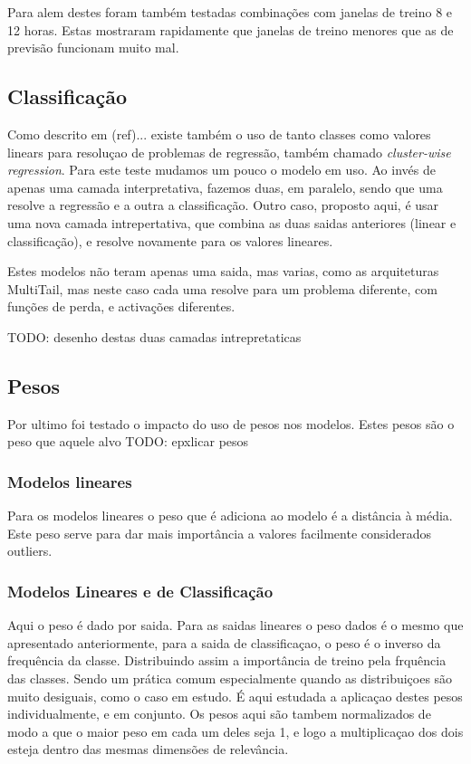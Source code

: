 Para alem destes foram também testadas combinações com janelas de treino 8 e 12 horas. Estas mostraram rapidamente que janelas de treino menores que as de previsão funcionam muito mal.

\subsection{Classificação}

Como descrito em (ref)... existe também o uso de tanto classes como valores linears para resoluçao de problemas de regressão, também chamado \textit{cluster-wise regression}.
Para este teste mudamos um pouco o modelo em uso. Ao invés de apenas uma camada interpretativa, fazemos duas, em paralelo, sendo que uma resolve a regressão e a outra a classificação.
Outro caso, proposto aqui, é usar uma nova camada intrepertativa, que combina as duas saidas anteriores (linear e classificação), e resolve novamente para os valores lineares.

Estes modelos não teram apenas uma saida, mas varias, como as arquiteturas MultiTail, mas neste caso cada uma resolve para um problema diferente, com funções de perda, e activações diferentes.

TODO: desenho destas duas camadas intrepretaticas

\subsection{Pesos}

Por ultimo foi testado o impacto do uso de pesos nos modelos. Estes pesos são o peso que aquele alvo TODO: epxlicar pesos

\subsubsection{Modelos lineares}

Para os modelos lineares o peso que é adiciona ao modelo é a distância à média.
Este peso serve para dar mais importância a valores facilmente considerados outliers.



\subsubsection{Modelos Lineares e de Classificação}
Aqui o peso é dado por saida. Para as saidas lineares o peso dados é o mesmo que apresentado anteriormente, para a saida de classificaçao, o peso é o inverso da frequência da classe.
Distribuindo assim a importância de treino pela frquência das classes. Sendo um prática comum especialmente quando as distribuiçoes são muito desiguais, como o caso em estudo.
É aqui estudada a aplicaçao destes pesos individualmente, e em conjunto. 
Os pesos aqui são tambem normalizados de modo a que o maior peso em cada um deles seja 1, e logo a multiplicaçao dos dois esteja dentro das mesmas dimensões de relevância.


